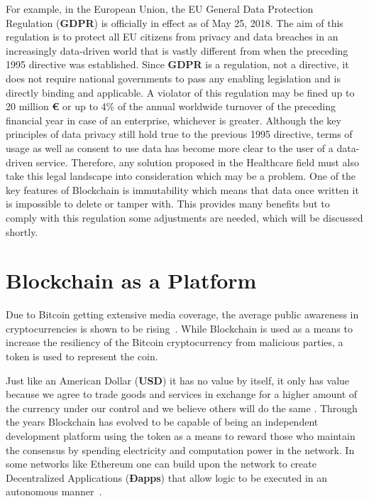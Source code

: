 For example, in the European Union, the EU General Data Protection Regulation
(\textbf{GDPR}) is officially in effect as of May 25, 2018. The aim of this
regulation is to protect all EU citizens from privacy and data breaches in an
increasingly data-driven world that is vastly different from when the preceding
1995 directive was established. Since \textbf{GDPR} is a regulation, not a
directive, it does not require national governments to pass any enabling
legislation and is directly binding and applicable. A violator of this
regulation may be fined up to 20 million \textbf{€} or up to 4\% of the annual
worldwide turnover of the preceding financial year in case of an enterprise,
whichever is greater. Although the key principles of data privacy still hold
true to the previous 1995 directive, terms of usage as well as consent to use
data has become more clear to the user of a data-driven service. Therefore, any
solution proposed in the Healthcare field must also take this legal landscape
into consideration which may be a problem. One of the key features of
Blockchain is immutability which means that data once written it is impossible
to delete or tamper with. This provides many benefits but to comply with this
regulation some adjustments are needed, which will be discussed shortly.

\section{Blockchain as a Platform}

Due to Bitcoin getting extensive media coverage, the average public awareness
in cryptocurrencies is shown to be rising~\cite{BitAwareness2017}. While
Blockchain is used as a means to increase the resiliency of the Bitcoin
cryptocurrency from malicious parties, a token is used to represent the coin. 

Just like an American Dollar (\textbf{USD}) it has no value by itself, it only
has value because we agree to trade goods and services in exchange for a higher
amount of the currency under our control and we believe others will do the same
\cite{aliessi2016}. Through the years Blockchain has evolved to be capable of
being an independent development platform using the token as a means to reward
those who maintain the consensus by spending electricity and computation power
in the network. In some networks like Ethereum one can build upon the network
to create Decentralized Applications (\textbf{Ðapps}) that allow logic to be
executed in an autonomous manner~\cite{Wood2017}. 

